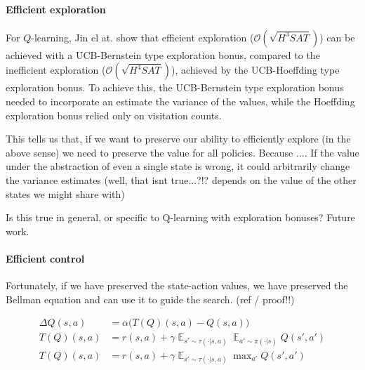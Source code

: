 \paragraph{Efficient exploration}

For $Q$-learning, Jin el at. \cite{Bubeck2018} show that efficient exploration ($\mathcal O(\sqrt{H^3SAT})$\footnotemark[13]) can be
achieved with a UCB-Bernstein type exploration bonus, compared to the inefficient exploration ($\mathcal O(\sqrt{H^4SAT})$),
achieved by the UCB-Hoeffding type exploration bonus. To achieve this, the UCB-Bernstein type exploration bonus needed to incorporate an
estimate the variance of the values, while the Hoeffding exploration bonus relied only on visitation counts.


This tells us that, if we want to preserve our ability to efficiently explore (in the above sense) we need to preserve the value for all policies.
Because ....
If the value under the abstraction of even a single state is wrong, it could arbitrarily change the variance estimates
(well, that isnt true...?!? depends on the value of the other states we might share with)

Is this true in general, or specific to Q-learning with exploration bonuses? Future work.

\paragraph{Efficient control}

Fortunately, if we have preserved the state-action values, we have preserved the Bellman equation and can use it to guide the search. {\color{red}(ref / proof!!)}

\begin{align*}
\Delta Q(s, a) &= \alpha \big(T(Q)(s, a) - Q(s, a) \big) \\
T(Q)(s, a) &= r(s, a) + \gamma \mathop{\mathbb E}_{s'\sim \tau(\cdot|s, a)} \mathop{\mathbb E}_{a'\sim \pi(\cdot|s)} Q(s', a') \tag{SARSA} \\
T(Q)(s, a) &= r(s, a) + \gamma \mathop{\mathbb E}_{s'\sim \tau(\cdot|s, a)} \mathop{\text{max}}_{a'} Q(s', a') \tag{Q-learning}
\end{align*}

